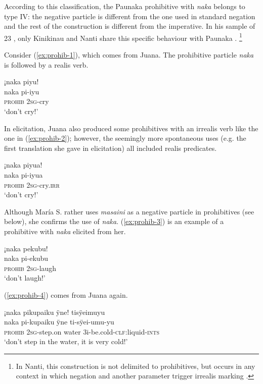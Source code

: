 According to this classification, the Paunaka prohibitive with \textit{naka} belongs to type IV: the negative particle is different from the one used in standard negation and the rest of the construction is different from the imperative. In his sample of 23 , only Kinikinau and Nanti share this specific behaviour with Paunaka \citep[271]{Michael2014b}.
\footnote{In Nanti, this construction is not delimited to prohibitives, but occurs in any context in which negation and another parameter trigger irrealis marking \citep[272--273]{Michael2014}.}

Consider (\ref{ex:prohib-1}), which comes from Juana. The prohibitive particle \textit{naka} is followed by a realis verb.

\ea\label{ex:prohib-1}
\begingl
\glpreamble ¡naka piyu!\\
\gla naka pi-iyu\\
\glb \textsc{prohib} 2\textsc{sg}-cry\\
\glft ‘don’t cry!’
\endgl
\trailingcitation{[jxx-e120430l-3a]}
\xe

In elicitation, Juana also produced some prohibitives with an irrealis verb like the one in (\ref{ex:prohib-2}); however, the seemingly more spontaneous uses (e.g. the first translation she gave in elicitation) all included realis predicates.

\ea\label{ex:prohib-2}
\begingl
\glpreamble ¡naka piyua!\\
\gla naka pi-iyua\\
\glb \textsc{prohib} 2\textsc{sg}-cry.\textsc{irr}\\
\glft ‘don’t cry!’
\endgl
\trailingcitation{[jxx-p150920l.041]}
\xe

Although María S. rather uses \textit{masaini} as a negative particle in prohibitives (see below), she confirms the use of \textit{naka}. (\ref{ex:prohib-3}) is an example of a prohibitive with \textit{naka} elicited from her.

\ea\label{ex:prohib-3}
\begingl
\glpreamble ¡naka pekubu!\\
\gla naka pi-ekubu\\
\glb \textsc{prohib} 2\textsc{sg}-laugh\\
\glft ‘don’t laugh!’
\endgl
\trailingcitation{[rxx-e150220s-1.08]}
\xe

(\ref{ex:prohib-4}) comes from Juana again.

\ea\label{ex:prohib-4}
\begingl
\glpreamble ¡naka pikupaiku ÿne! tisÿeimuyu\\
\gla naka pi-kupaiku ÿne ti-sÿei-umu-yu\\
\glb \textsc{prohib} 2\textsc{sg}-step.on water 3i-be.cold-\textsc{clf:}liquid-\textsc{ints}\\
\glft ‘don’t step in the water, it is very cold!’
\endgl
\trailingcitation{[jxx-e150925l-1.083-084]}
\xe

